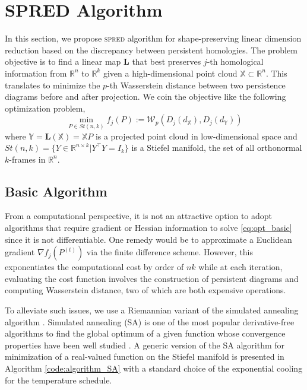 \documentclass[11pt]{article}
\newcommand{\bbR}{\mathbb{R}}
\begin{document}
\section{\textsc{SPRED} Algorithm}\label{sec:algorithm}


In this section, we propose \textsc{spred} algorithm for shape-preserving linear dimension reduction based on the discrepancy between persistent homologies. The problem objective is to find a linear map $\mathbf{L}$ that best preserves $j$-th homological information from $\mathbb{R}^n$ to $\mathbb{R}^k$ given a high-dimensional point cloud $\mathbb{X} \subset \mathbb{R}^n$. This translates to minimize the $p$-th Wasserstein distance between two persistence diagrams before and after projection. We coin the objective like the following optimization problem,
\begin{equation}\label{eq:opt_basic}
\min_{P \in St(n,k)} f_j (P) := \mathcal{W}_p (D_j (d_\mathbb{X}), D_j(d_\mathbb{Y}))
\end{equation}
where $\mathbb{Y} = \mathbf{L}(\mathbb{X}) = \mathbb{X} P$ is a projected point cloud in low-dimensional space and $St(n,k) = \lbrace Y \in \bbR^{n\times k}|Y^\top Y=I_k \rbrace$ is a Stiefel manifold, the set of all orthonormal $k$-frames in $\mathbb{R}^n$. 




\subsection{Basic Algorithm}
From a computational perspective, it is not an attractive option to adopt algorithms that require gradient or Hessian information to solve \eqref{eq:opt_basic} since it is not differentiable. One remedy would be to approximate a Euclidean gradient $\nabla f_j (P^{(t)})$ via the finite difference scheme. However, this exponentiates the computational cost by order of $nk$ while at each iteration, evaluating the cost function involves the construction of persistent diagrams and computing Wasserstein distance, two of which are both expensive operations. 

To alleviate such issues, we use a Riemannian variant of the simulated annealing algorithm \citep{kirkpatrick_optimization_1983-1}. Simulated annealing (SA) is one of the most popular derivative-free algorithms to find the global optimum of a given function whose convergence properties have been well studied \citep{faigle_note_1991, locatelli_convergence_2000, yang_convergence_2000}. A generic version of the SA algorithm for minimization of a real-valued function on the Stiefel manifold is presented in Algorithm \ref{code:algorithm_SA} with a standard choice of the exponential cooling for the temperature schedule.
\end{document}
